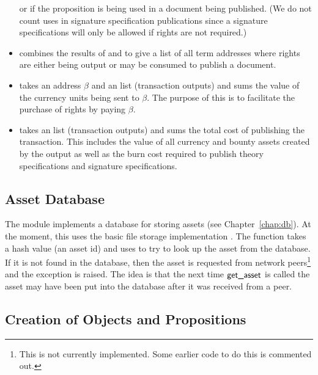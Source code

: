 \begin{itemize}
or if the proposition is being used in a document being published.
(We do not count uses in signature specification publications since
a signature specifications will only be allowed if rights are not required.)
\item {} combines the results of {}
and {} to give a list of all term addresses
where rights are either being output or may be consumed to publish a document.
\item {} takes an address $\beta$
and an {} list (transaction outputs)
and sums the value of the currency units being sent to $\beta$.
The purpose of this is to facilitate the purchase of rights by paying $\beta$.
\item {} takes an {} list (transaction outputs)
and sums the total cost of publishing the transaction.
This includes the value of all currency and bounty assets created by the output
as well as the burn cost required to publish theory specifications
and signature specifications.
\end{itemize}

\subsection{Asset Database}

The module {} implements a database for storing assets
(see Chapter~\ref{chap:db}).
At the moment, this uses the basic file storage implementation {}.
The function {} takes a hash value (an asset id) and
uses {} to try to look up the asset from the database.
If it is not found in the database,
then the asset is requested from network peers\footnote{This is not currently implemented. Some earlier code to do this is commented out.}
and the exception {} is raised.
The idea is that the next time ${\constr{get\_asset}}$ is
called the asset
may have been put into the database after it was received from a peer.

\subsection{Creation of Objects and Propositions}\label{sec:outputcreates}

